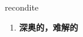 
\begin{frame}
{\huge recondite}
\begin{center}
\begin{enumerate}\Large
  \item \textbf{深奥的，难解的}
\end{enumerate}
\end{center}
\end{frame}
